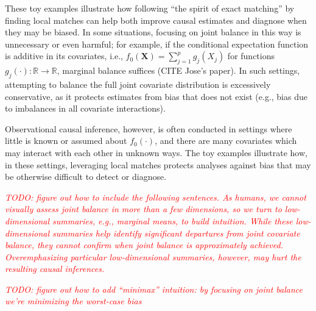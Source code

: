 \documentclass{article}
\newcommand{\bX}{\mathbf{X}}
\newcommand{\note}[1]{\textcolor{red}{\textit{#1}}}
\begin{document}
These toy examples illustrate how following ``the spirit of exact matching'' by finding local matches can help both improve causal estimates and diagnose when they may be biased.
In some situations, focusing on joint balance in this way is unnecessary or even harmful;
for example, if the conditional expectation function is additive in its covariates, i.e., $f_0(\bX) = \sum_{j=1}^p g_j(X_j)$ for functions $g_j(\cdot):\mathbb{R} \to \mathbb{R}$, marginal balance suffices (CITE Jose's paper).
In such settings, attempting to balance the full joint covariate distribution is excessively conservative, as it protects estimates from bias that does not exist (e.g., bias due to imbalances in all covariate interactions).

Observational causal inference, however, is often conducted in settings where little is known or assumed about $f_0(\cdot)$, and there are many covariates which may interact with each other in unknown ways.
The toy examples illustrate how, in these settings, leveraging local matches protects analyses against bias that may be otherwise difficult to detect or diagnose.


\note{TODO: figure out how to include the following sentences.
As humans, we cannot visually assess joint balance in more than a few dimensions, so we turn to low-dimensional summaries, e.g., marginal means, to build intuition.
While these low-dimensional summaries help identify significant departures from joint covariate balance, they cannot confirm when joint balance is approximately achieved.
Overemphasizing particular low-dimensional summaries, however, may hurt the resulting causal inferences.
}

\note{TODO: figure out how to add ``minimax'' intuition: by focusing on joint balance we're minimizing the worst-case bias}


\end{document}
